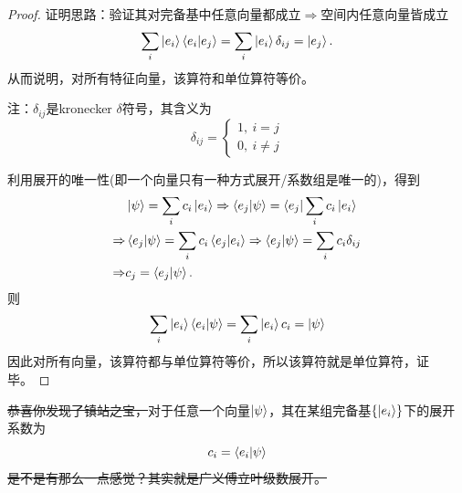\documentclass[12pt,a4paper,openany,twoside]{book}
\numberwithin{equation}{section}
\begin{document}
        \begin{proof}
          证明思路：验证其对完备基中任意向量都成立$\Rightarrow$空间内任意向量皆成立
          \begin{equation}
            \sum_i{\ket{e_i}\bra{e_i}\ket{e_j}}=\sum_i{\ket{e_i}\delta_{ij}}=\ket{e_j}.
          \end{equation}
          从而说明，对所有特征向量，该算符和单位算符等价。

          注：$\delta_{ij}$是kronecker $\delta$符号，其含义为
          \begin{equation}
            \delta_{ij}=
            \begin{cases}
              1,\ i=j\\
              0,\ i\neq j
            \end{cases}
          \end{equation}

          利用展开的唯一性(即一个向量只有一种方式展开/系数组是唯一的)，得到
          \begin{equation}
            \begin{aligned}
              &\ket{\psi}=\sum_i{c_i\ket{e_i}}\Rightarrow\bra{e_j}\ket{\psi}=\bra{e_j}\sum_i{c_i\ket{e_i}}\\
              \Rightarrow&\bra{e_j}\ket{\psi}=\sum_i{c_i\bra{e_j}\ket{e_i}}\Rightarrow\bra{e_j}\ket{\psi}=\sum_i{c_i\delta_{ij}}\\
              \Rightarrow&c_j=\bra{e_j}\ket{\psi}.
            \end{aligned}
          \end{equation}
          则
          \begin{equation}
            \sum_i{\ket{e_i}\bra{e_i}\ket{\psi}}=\sum_i{\ket{e_i}c_i}=\ket{\psi}
          \end{equation}
          因此对所有向量，该算符都与单位算符等价，所以该算符就是单位算符，证毕。
        \end{proof}
        \sout{恭喜你发现了镇站之宝，}对于任意一个向量$\ket{\psi}$，其在某组完备基$\qty{\ket{e_i}}$下的展开系数为
        \begin{equation}
          c_i=\bra{e_i}\ket{\psi} 
          \label{expansion coeff}
        \end{equation}
        \sout{是不是有那么一点感觉？其实就是广义傅立叶级数展开。}
\end{document}
